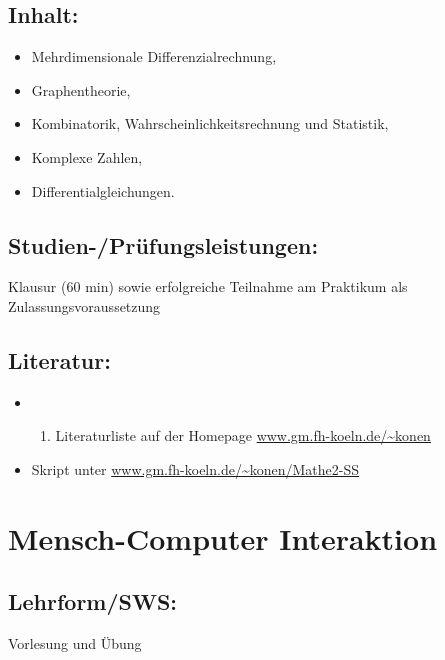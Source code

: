\section*{Inhalt:}\label{inhalt-14}

\begin{itemize}
\item
  Mehrdimensionale Differenzialrechnung,
\item
  Graphentheorie,
\item
  Kombinatorik, Wahrscheinlichkeitsrechnung und Statistik,
\item
  Komplexe Zahlen,
\item
  Differentialgleichungen.
\end{itemize}

\section*{Studien-/Prüfungsleistungen:}\label{studien-pruxfcfungsleistungen-9}

Klausur (60 min) sowie erfolgreiche Teilnahme am Praktikum als
Zulassungsvoraussetzung

\section*{Literatur:}\label{literatur-11}

\begin{itemize}
\item
  \begin{enumerate}
  \def\labelenumi{\alph{enumi}.}
  \setcounter{enumi}{18}
  \tightlist
  \item
    Literaturliste auf der Homepage \url{www.gm.fh-koeln.de/~konen}
  \end{enumerate}
\item
  Skript unter \url{www.gm.fh-koeln.de/~konen/Mathe2-SS}
\end{itemize}

\chapter{Mensch-Computer Interaktion}\label{mensch-computer-interaktion}

\section*{Lehrform/SWS:}\label{lehrformsws-11}

Vorlesung und Übung

